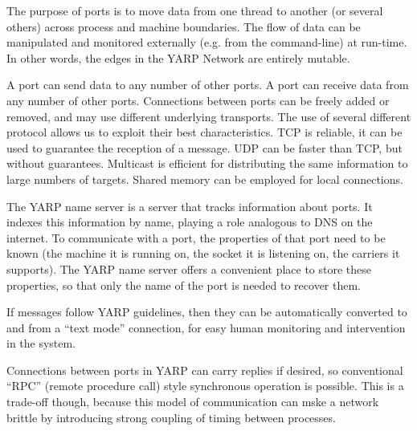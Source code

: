 The purpose of ports is to move data from one thread to another (or
several others) across process and machine boundaries. The flow of
data can be manipulated and monitored externally (e.g. from the
command-line) at run-time. In other words, the edges in the YARP
Network are entirely mutable.

A port can send data to any number of other ports. A port can receive
data from any number of other ports. Connections between ports can be
freely added or removed, and may use different underlying transports.
 The use of several different protocol allows us to exploit
their best characteristics.
TCP is reliable, it can be used to guarantee the reception of a message.
UDP can be faster than TCP, but without guarantees.
Multicast is efficient for distributing the same information to large
numbers of targets.
Shared memory can be employed for local connections.

The YARP name server is a server that tracks information about
ports. It indexes this information by name, playing a role analogous
to DNS on the internet. To communicate with a port, the properties of
that port need to be known (the machine it is running on, the socket
it is listening on, the carriers it supports). The YARP name server
offers a convenient place to store these properties, so that only the
name of the port is needed to recover them.






If messages follow YARP guidelines, then they can be
automatically converted to and from a ``text mode'' connection, for easy
human monitoring and intervention in the system.

Connections between ports in YARP can carry replies if desired,
so conventional ``RPC'' (remote procedure call) style synchronous
operation is possible.  This is a trade-off though, because this
model of communication can mske a network brittle by introducing
strong coupling of timing between processes.


